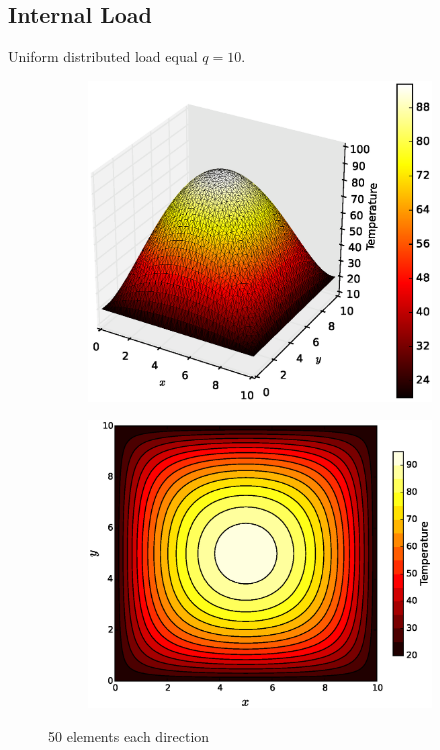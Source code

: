 \documentclass[10pt, a4paper]{article}
\begin{document}
\subsection{Internal Load}

Uniform distributed load equal $q=10$.

\begin{figure}[H]
\centering
	\begin{subfigure}[H]{0.5\textwidth}
		\includegraphics[width=1.2\textwidth]{fig/figure_3.eps}
		\caption{}
		\label{fig:1}
	\end{subfigure}
	\begin{subfigure}[H]{0.3\textwidth}
		\includegraphics[width=\textwidth]{fig/figure_3.1.eps}
		\caption{}
		\label{fig:2}
	\end{subfigure}
	\caption{50 elements each direction}
	\label{fig:3_1}
\end{figure}
\end{document}
